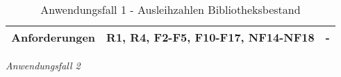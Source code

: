 \begin{table}[h]
\begin{adjustbox}{max width=\textwidth}
\begin{tabular}{lp{7.5cm}p{7.5cm}}
        Anforderungen                   &R1, R4, F2-F5, F10-F17, NF14-NF18& -\\ 
        \bottomrule
    \end{tabular}
    \end{adjustbox}
    \caption{%
    Anwendungsfall 1 - Ausleihzahlen Bibliotheksbestand
    }
    \label{tab:AF_Bibliotheksbestand}
    \end{table}

\endgroup


\newpage
\noindent
\textit{Anwendungsfall 2}


